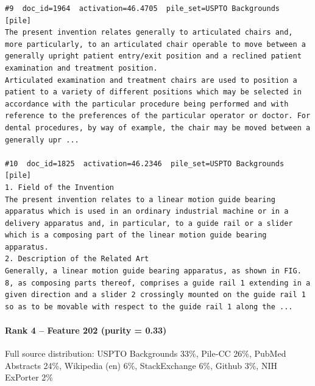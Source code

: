 \begin{verbatim}
#9  doc_id=1964  activation=46.4705  pile_set=USPTO Backgrounds  [pile]
The present invention relates generally to articulated chairs and, more particularly, to an articulated chair operable to move between a generally upright patient entry/exit position and a reclined patient examination and treatment position.
Articulated examination and treatment chairs are used to position a patient to a variety of different positions which may be selected in accordance with the particular procedure being performed and with reference to the preferences of the particular operator or doctor. For dental procedures, by way of example, the chair may be moved between a generally upr ...

#10  doc_id=1825  activation=46.2346  pile_set=USPTO Backgrounds  [pile]
1. Field of the Invention
The present invention relates to a linear motion guide bearing apparatus which is used in an ordinary industrial machine or in a delivery apparatus and, in particular, to a guide rail or a slider which is a composing part of the linear motion guide bearing apparatus.
2. Description of the Related Art
Generally, a linear motion guide bearing apparatus, as shown in FIG. 8, as composing parts thereof, comprises a guide rail 1 extending in a given direction and a slider 2 crossingly mounted on the guide rail 1 so as to be movable with respect to the guide rail 1 along the ...

\end{verbatim}

\paragraph*{Rank 4 -- Feature 202 (purity = 0.33)}

Full source distribution: USPTO Backgrounds 33\%, Pile-CC 26\%, PubMed Abstracts 24\%, Wikipedia (en) 6\%, StackExchange 6\%, Github 3\%, NIH ExPorter 2\%

